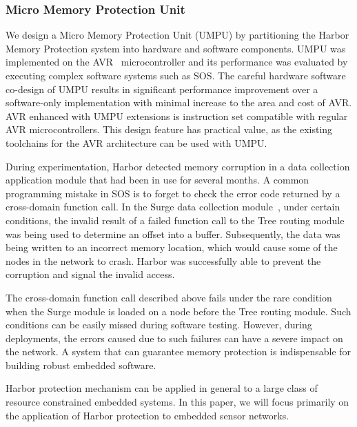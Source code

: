 \subsubsection{Micro Memory Protection Unit}
%
We design a Micro Memory Protection Unit (UMPU) by partitioning the
Harbor Memory Protection system into hardware and software components.
%
UMPU was implemented on the AVR~\cite{avrdatasheet} microcontroller and
its performance was evaluated by executing complex software systems
such as SOS.
%
The careful hardware software co-design of UMPU results in significant
performance improvement over a software-only implementation with minimal
increase to the area and cost of AVR.
%
AVR enhanced with UMPU extensions is instruction set compatible with
regular AVR microcontrollers.
%
This design feature has practical value, as the existing
toolchains for the AVR architecture can be used with UMPU.
%
%
%


During experimentation, Harbor detected memory corruption in a data
collection application module that had been in use for several months.
%
A common programming mistake in SOS is to forget to check the error code
returned by a cross-domain function call.
%
In the Surge data collection module~\cite{woo03surge}, under certain
conditions, the invalid result of a failed function call to the Tree
routing module was being used to determine an offset into a buffer.
%
Subsequently, the data was being written to an incorrect memory
location, which would cause some of the nodes in the network to crash.
%
Harbor was successfully able to prevent the corruption and signal the
invalid access.
%


The cross-domain function call described above fails under the rare
condition when the Surge module is loaded on a node before the Tree
routing module.
%
Such conditions can be easily missed during software testing.
%
However, during deployments, the errors caused due to such failures
can have a severe impact on the network.
%
A system that can guarantee memory protection is indispensable for
building robust embedded software.
%

Harbor protection mechanism can be applied in general to a large class
of resource constrained embedded systems.
%
In this paper, we will focus primarily on the application of Harbor
protection to embedded sensor networks.
%
%
%
